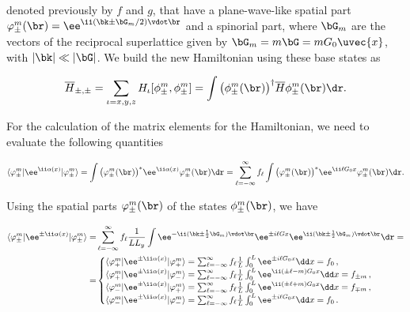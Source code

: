 \noindent denoted previously by $f$ and $g$, that have a plane-wave-like spatial part $\varphi_{\pm}^{m}(\br) = \ee^{\ii ( \bk \pm \bG_m/2) \vdot \br}$ and a spinorial part, where $\bG_m$ are the vectors of the reciprocal superlattice given by $\bG_m = m \bG = m G_0 \uvec{x}$, with $| \bk | \ll |\bG|$.
We build the new Hamiltonian using these base states as

\begin{equation}
    \label{eq:new_H}
    \overline{H}_{\pm, \pm} = \sum_{\iota=x,y,z} H_{\iota}[\phi_{\pm}^{m},\phi_{\pm}^{m}] = \int \big(\phi_{\pm}^{m}(\br)\big)^{\dagger} \overline{H} \phi_{\pm}^{m}(\br) \dr.
\end{equation}

\noindent For the calculation of the matrix elements for the Hamiltonian, we need to evaluate the following quantities

\begin{equation}
    \langle \varphi^{m}_{\pm} \vert \ee^{\ii\alpha(x)} \vert \varphi^{m}_{\pm} \rangle = \int \big(\varphi^{m}_{\pm} (\br) \big)^{*} \ee^{\ii\alpha(x)} \varphi_{\pm}^{m}(\br) \dr = \sum_{\ell=-\infty}^{\infty}f_{\ell} \int  \big(\varphi^{m}_{\pm} (\br) \big)^{*} \ee^{\ii\ell G_{0}x} \varphi_{\pm}^{m}(\br) \dr .
\end{equation}

\noindent Using the spatial parts $\varphi^{m}_{\pm}(\br)$ of the states $\phi^{m}_{\pm}(\br)$, we have

\begin{equation}
\begin{aligned}
    \langle \varphi^{m}_{\pm} \vert \ee^{\pm\ii \alpha (x)} \vert \varphi^{m}_{\pm} \rangle= & \sum_{\ell=-\infty}^{\infty}f_{\ell}\frac{1}{LL_{y}}\int \ee^{-\ii(\bk\pm \frac{1}{2} \bG_{m})\vdot\br}\ee^{\pm i\ell Gx}\ee^{\ii(\bk\pm \frac{1}{2} \bG_{m})\vdot\br} \dr = \\
    = &
        \begin{cases}
            \langle \varphi^{m}_{+} \vert \ee^{\pm\ii \alpha (x)}\vert \varphi^{m}_{+} \rangle=\sum_{\ell=-\infty}^{\infty}f_{\ell}\frac{1}{L}\int_{0}^{L} \ee^{\pm i\ell G_{0}x} \dd x =f_{0} \,,\\
            \langle \varphi^{m}_{+} \vert \ee^{\pm\ii \alpha (x)}\vert \varphi^{m}_{-} \rangle=\sum_{\ell=-\infty}^{\infty}f_{\ell}\frac{1}{L}\int_{0}^{L} \ee^{\ii(\pm\ell-m)G_{0}x} \dd x =f_{\pm m} \,,\\
            \langle \varphi^{m}_{-} \vert \ee^{\pm\ii \alpha (x)}\vert \varphi^{m}_{+} \rangle=\sum_{\ell=-\infty}^{\infty}f_{\ell}\frac{1}{L}\int_{0}^{L} \ee^{\ii(\pm\ell+m)G_{0}x} \dd x =f_{\mp m} \,,\\
            \langle \varphi^{m}_{-} \vert \ee^{\pm\ii \alpha (x)}\vert \varphi^{m}_{-} \rangle=\sum_{\ell=-\infty}^{\infty}f_{\ell}\frac{1}{L}\int_{0}^{L} \ee^{\pm i\ell G_{0}x} \dd x =f_{0} \,.
        \end{cases}
\end{aligned}
\end{equation}


